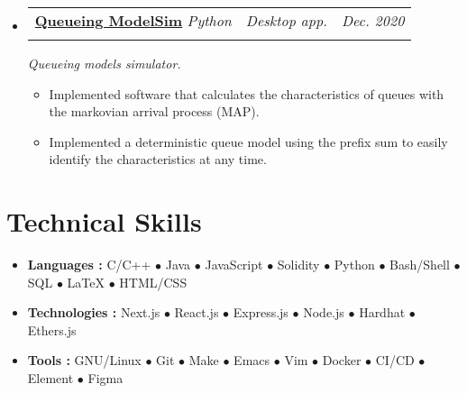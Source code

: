 \documentclass[letterpaper, 11pt]{article}
\makeatletter
\newcommand{\project}[7] {
  \vspace{-1pt}\item
  \begin{tabular*}{0.97\textwidth}[t]{ll@{\extracolsep{\fill}}r}
    #1 \href{#4}{\textbf{\color{RoyalBlue}#2}}
    \textbar{} \textit{\small#5} \textbar{ } & \textit{\footnotesize#7} & \textit{\small #3} \\
    \vspace{-10pt}
  \end{tabular*}
  \textit{\small #6}
  \vspace{-8pt}
}
\newcommand{\subproject}[1] {
\item\small
  {#1}
  \vspace{-2pt}
}
\newcommand{\technicalskill}[3] {
  \vspace{-1pt}
\item\small
  #1 \textbf{#2 : }{\footnotesize{#3}}
  \vspace{-2pt}
}
\newcommand{\bulletitem}[1] {{\tiny$\bullet$} #1}
\makeatother
\begin{document}
\begin{itemize}[leftmargin=*]
  \project
  {\faIcon{user-clock}}
  {Queueing ModelSim}{Dec. 2020}
  {https://github.com/AbdeltwabMF/Queueing-ModelSim}{Python}
  {Queueing models simulator.}{Desktop app.}

  \begin{itemize}
    \subproject
    {Implemented software that calculates the characteristics of queues with the markovian arrival process (MAP).}
    \subproject
    {Implemented a deterministic queue model using the prefix sum to easily identify the characteristics at any time.}
  \end{itemize}\vspace{-4pt}
\end{itemize}

\section{Technical Skills}
\begin{itemize}[leftmargin=*]
  \technicalskill
  {}{Languages}
  {C/C++ \bulletitem{Java} \bulletitem{JavaScript} \bulletitem{Solidity} \bulletitem{Python} \bulletitem{Bash/Shell} \bulletitem{SQL} \bulletitem{\LaTeX{}} \bulletitem{HTML/CSS}}

  \technicalskill
  {}{Technologies}
  {Next.js \bulletitem{React.js} \bulletitem{Express.js} \bulletitem{Node.js} \bulletitem{Hardhat} \bulletitem{Ethers.js}}

  \technicalskill
  {}{Tools}
  {GNU/Linux \bulletitem{Git} \bulletitem{Make} \bulletitem{Emacs} \bulletitem{Vim} \bulletitem{Docker} \bulletitem{CI/CD} \bulletitem{Element} \bulletitem{Figma}}
\end{itemize}
\end{document}
